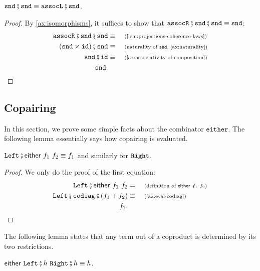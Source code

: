 \begin{lemma}\label{lem:snd-snd-is-assocl-snd}
    $\sndterm \comp \sndterm \equiv \assoclterm \comp \sndterm$.
\end{lemma}
\begin{proof}
    By \cref{ax:isomorphisms}, it suffices to show that $\assocrterm \comp \sndterm \comp \sndterm \equiv \sndterm$:
    \begin{align*}
        \assocrterm \comp \sndterm \comp \sndterm \equalbecause{\cref{lem:projections-coherence-laws}} \\ 
        (\sndterm \times \idterm) \comp \sndterm \equalbecause{naturality of $\sndterm$, \cref{ax:naturality}} \\
        \sndterm \comp \idterm \equalbecause{\cref{ax:associativity-of-composition}} \\
        \sndterm.
    \end{align*}
\end{proof}

\subsection{Copairing}\label{sec:co-pairing-simple-facts}

In this section, we prove some simple facts about the  combinator $\mathtt{either}$. The following lemma essentially says how copairing is evaluated.

\begin{lemma}\label{lem:case-equivalence}
        $\leftterm\comp \either{f_1}{f_2} \equiv f_1$ and similarly for $\mathtt{Right}$.
\end{lemma}
    \begin{proof}
        We only do the proof of the first equation:
        \begin{align*}
            \leftterm\comp \either{f_1}{f_2} &= \why{definition of $\either{f_1}{f_2}$}\\
            \leftterm\comp \codiagterm\comp (f_1 + f_2) \equalbecause{\cref{ax:eval-codiag}}\\
            f_1.
        \end{align*}
    \end{proof}

The following lemma states that any term out of a coproduct is determined by its two restrictions.

\begin{lemma}\label{lem:either-uniqueness}
	$\either{\leftterm\comp{}h}{\rightterm\comp{}h} \equiv h$.
\end{lemma}

